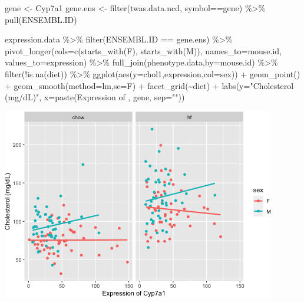 \documentclass[
]{article}
\newenvironment{Shaded}{\begin{snugshade}}{\end{snugshade}}
\newcommand{\AttributeTok}[1]{\textcolor[rgb]{0.77,0.63,0.00}{#1}}
\newcommand{\FunctionTok}[1]{\textcolor[rgb]{0.00,0.00,0.00}{#1}}
\newcommand{\NormalTok}[1]{#1}
\newcommand{\OtherTok}[1]{\textcolor[rgb]{0.56,0.35,0.01}{#1}}
\newcommand{\SpecialCharTok}[1]{\textcolor[rgb]{0.00,0.00,0.00}{#1}}
\newcommand{\StringTok}[1]{\textcolor[rgb]{0.31,0.60,0.02}{#1}}
\begin{document}
\begin{Shaded}
\begin{Highlighting}[]
\NormalTok{gene }\OtherTok{\textless{}{-}} \StringTok{\textquotesingle{}Cyp7a1\textquotesingle{}}
\NormalTok{gene.ens }\OtherTok{\textless{}{-}} \FunctionTok{filter}\NormalTok{(twas.data.ncd, symbol}\SpecialCharTok{==}\NormalTok{gene) }\SpecialCharTok{\%\textgreater{}\%} \FunctionTok{pull}\NormalTok{(ENSEMBL.ID)}

\NormalTok{expression.data }\SpecialCharTok{\%\textgreater{}\%}
  \FunctionTok{filter}\NormalTok{(ENSEMBL.ID }\SpecialCharTok{==}\NormalTok{ gene.ens) }\SpecialCharTok{\%\textgreater{}\%}
  \FunctionTok{pivot\_longer}\NormalTok{(}\AttributeTok{cols=}\FunctionTok{c}\NormalTok{(}\FunctionTok{starts\_with}\NormalTok{(}\StringTok{\textquotesingle{}F\textquotesingle{}}\NormalTok{),}
                      \FunctionTok{starts\_with}\NormalTok{(}\StringTok{\textquotesingle{}M\textquotesingle{}}\NormalTok{)),}
               \AttributeTok{names\_to=}\StringTok{\textquotesingle{}mouse.id\textquotesingle{}}\NormalTok{,}
               \AttributeTok{values\_to=}\StringTok{\textquotesingle{}expression\textquotesingle{}}\NormalTok{) }\SpecialCharTok{\%\textgreater{}\%}
  \FunctionTok{full\_join}\NormalTok{(phenotype.data,}\AttributeTok{by=}\StringTok{\textquotesingle{}mouse.id\textquotesingle{}}\NormalTok{) }\SpecialCharTok{\%\textgreater{}\%}
  \FunctionTok{filter}\NormalTok{(}\SpecialCharTok{!}\FunctionTok{is.na}\NormalTok{(diet)) }\SpecialCharTok{\%\textgreater{}\%}
  \FunctionTok{ggplot}\NormalTok{(}\FunctionTok{aes}\NormalTok{(}\AttributeTok{y=}\NormalTok{chol1,expression,}\AttributeTok{col=}\NormalTok{sex)) }\SpecialCharTok{+}
  \FunctionTok{geom\_point}\NormalTok{() }\SpecialCharTok{+}
  \FunctionTok{geom\_smooth}\NormalTok{(}\AttributeTok{method=}\StringTok{\textquotesingle{}lm\textquotesingle{}}\NormalTok{,}\AttributeTok{se=}\NormalTok{F) }\SpecialCharTok{+}
  \FunctionTok{facet\_grid}\NormalTok{(}\SpecialCharTok{\textasciitilde{}}\NormalTok{diet) }\SpecialCharTok{+}
  \FunctionTok{labs}\NormalTok{(}\AttributeTok{y=}\StringTok{"Cholesterol (mg/dL)"}\NormalTok{,}
       \AttributeTok{x=}\FunctionTok{paste}\NormalTok{(}\StringTok{\textquotesingle{}Expression of \textquotesingle{}}\NormalTok{, gene, }\AttributeTok{sep=}\StringTok{""}\NormalTok{))}
\end{Highlighting}
\end{Shaded}

\includegraphics{figures/cyp7a1-associations-1.png}
\end{document}
